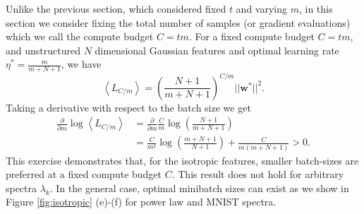 \documentclass{article} %
\def\w{\bm w}
\def\w{\mathbf w}
\begin{document}
Unlike the previous section, which considered fixed $t$ and varying $m$, in this section we consider fixing the total number of samples (or gradient evaluations) which we call the compute budget $C=tm$. For a fixed compute budget $C = tm$, and unstructured $N$ dimensional Gaussian features and optimal learning rate $\eta^* = \frac{m}{m+N+1}$, we have
\begin{equation}
   \left<  L_{C/m} \right> = \left( \frac{N+1}{m+N+1} \right)^{C/m} ||\w^*||^2.
\end{equation}
Taking a derivative with respect to the batch size we get
\begin{align}
   \frac{\partial}{\partial m} \log  \left< L_{C/m} \right> &= \frac{\partial }{\partial m} \frac{C}{m} \log\left( \frac{N+1}{m+N+1} \right) \nonumber
   \\
   &= \frac{C}{m^2} \log\left( \frac{m+N+1}{N+1} \right) +  \frac{C}{m (m+N+1)} > 0.
\end{align} 
This exercise demonstrates that, for the isotropic features, smaller batch-sizes are preferred at a fixed compute budget $C$. 
%
This result does not hold for arbitrary spectra $\lambda_k$. In the general case, optimal minibatch sizes can exist as we show in Figure \ref{fig:isotropic} (e)-(f) for power law and MNIST spectra.




\end{document}

